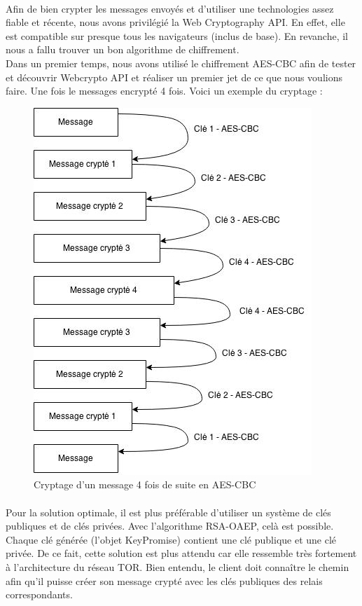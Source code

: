 \documentclass[a4paper,12pt]{report}
\begin{document}
	\paragraph*{}
	Afin de bien crypter les messages envoyés et d'utiliser une technologies assez fiable et récente, nous avons privilégié la Web Cryptography API. En effet, elle est compatible sur presque tous les navigateurs (inclus de base). En revanche, il nous a fallu trouver un bon algorithme de chiffrement.\\
	Dans un premier temps, nous avons utilisé le chiffrement AES-CBC afin de tester et découvrir Webcrypto API et réaliser un premier jet de ce que nous voulions faire. Une fois le messages encrypté 4 fois. Voici un exemple du cryptage :
	\newpage	
	\begin{figure}[h] %
		\includegraphics[scale=0.70]{AES.jpg}
		\caption{Cryptage d'un message 4 fois de suite en AES-CBC}
		\label{AES}
	\end{figure}
	\paragraph*{}
	Pour la solution optimale, il est plus préférable d'utiliser un système de clés publiques et de clés privées. Avec l'algorithme RSA-OAEP, celà est possible. Chaque clé générée (l'objet KeyPromise) contient une clé publique et une clé privée. De ce fait, cette solution est plus attendu car elle ressemble très fortement à l'architecture du réseau TOR. Bien entendu, le client doit connaître le chemin afin qu'il puisse créer son message crypté avec les clés publiques des relais correspondants.
\end{document}

